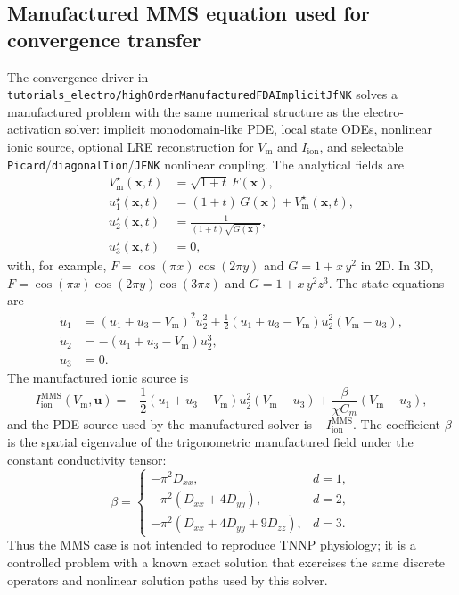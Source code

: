 \documentclass[11pt,a4paper]{article}
\newcommand{\code}[1]{\texttt{\small #1}}
\newcommand{\Vm}{V_{\text{m}}}
\newcommand{\Iion}{I_{\mathrm{ion}}}
\begin{document}
\subsection{Manufactured MMS equation used for convergence transfer}

The convergence driver in
\code{tutorials\_electro/highOrderManufacturedFDAImplicitJfNK} solves a
manufactured problem with the same numerical structure as the
electro-activation solver: implicit monodomain-like PDE, local state
ODEs, nonlinear ionic source, optional LRE reconstruction for $\Vm$ and
$\Iion$, and selectable \code{Picard}/\code{diagonalIion}/\code{JFNK}
nonlinear coupling. The analytical fields are
\begin{align}
  \Vm^{\star}(\mathbf{x},t) &= \sqrt{1+t}\,F(\mathbf{x}),\\
  u_1^{\star}(\mathbf{x},t) &= (1+t)\,G(\mathbf{x})+\Vm^{\star}(\mathbf{x},t),\\
  u_2^{\star}(\mathbf{x},t) &=
      \frac{1}{(1+t)\sqrt{G(\mathbf{x})}},\\
  u_3^{\star}(\mathbf{x},t) &= 0,
\end{align}
with, for example,
$F=\cos(\pi x)\cos(2\pi y)$ and $G=1+x\,y^2$ in 2D. In 3D,
$F=\cos(\pi x)\cos(2\pi y)\cos(3\pi z)$ and
$G=1+x\,y^2 z^3$. The state equations are
\begin{align}
  \dot u_1 &=
      (u_1+u_3-\Vm)^2 u_2^2
    + \frac{1}{2}(u_1+u_3-\Vm)u_2^2(\Vm-u_3),\\
  \dot u_2 &= -(u_1+u_3-\Vm)u_2^3,\\
  \dot u_3 &= 0.
\end{align}
The manufactured ionic source is
\begin{equation}
  \Iion^{\mathrm{MMS}}(\Vm,\mathbf{u})
  =
  -\frac{1}{2}(u_1+u_3-\Vm)u_2^2(\Vm-u_3)
  + \frac{\beta}{\chi C_m}(\Vm-u_3),
\end{equation}
and the PDE source used by the manufactured solver is
$-\Iion^{\mathrm{MMS}}$. The coefficient $\beta$ is the spatial
eigenvalue of the trigonometric manufactured field under the constant
conductivity tensor:
\[
  \beta =
  \begin{cases}
    -\pi^2 D_{xx}, & d=1,\\
    -\pi^2(D_{xx}+4D_{yy}), & d=2,\\
    -\pi^2(D_{xx}+4D_{yy}+9D_{zz}), & d=3.
  \end{cases}
\]
Thus the MMS case is not intended to reproduce TNNP physiology; it is a
controlled problem with a known exact solution that exercises the same
discrete operators and nonlinear solution paths used by this solver.
\end{document}
